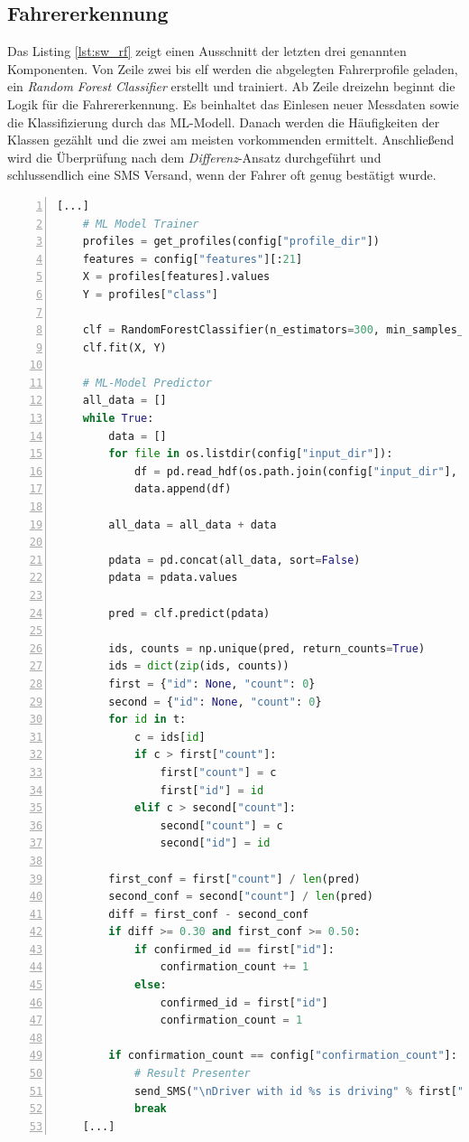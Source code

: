 \subsection{Fahrererkennung}
\label{sec:driver_identification}

Das Listing \ref{lst:sw_rf} zeigt einen Ausschnitt der letzten drei genannten Komponenten. Von Zeile zwei bis elf werden die abgelegten Fahrerprofile geladen, ein \textit{Random Forest Classifier} erstellt und trainiert. Ab Zeile dreizehn beginnt die Logik für die Fahrererkennung. Es beinhaltet das Einlesen neuer Messdaten sowie die Klassifizierung durch das ML-Modell. Danach werden die Häufigkeiten der Klassen gezählt und die zwei am meisten vorkommenden ermittelt. Anschließend wird die Überprüfung nach dem \textit{Differenz}-Ansatz durchgeführt und schlussendlich eine SMS Versand, wenn der Fahrer oft genug bestätigt wurde.

\begin{lstlisting}[frame=lines, caption=Ausschnitt Fahreridentifikation, captionpos=b, label = lst:sw_rf, numbers=left, language=Python, showstringspaces=false, basicstyle=\footnotesize]
    [...]
    # ML Model Trainer
    profiles = get_profiles(config["profile_dir"])
    features = config["features"][:21]
    X = profiles[features].values
    Y = profiles["class"]

    clf = RandomForestClassifier(n_estimators=300, min_samples_leaf=1, min_samples_split=3, criterion="gini", max_depth=None)
    clf.fit(X, Y)

    # ML-Model Predictor
    all_data = []
    while True:
        data = []
        for file in os.listdir(config["input_dir"]):
            df = pd.read_hdf(os.path.join(config["input_dir"], file))
            data.append(df)

        all_data = all_data + data

        pdata = pd.concat(all_data, sort=False)
        pdata = pdata.values

        pred = clf.predict(pdata)

        ids, counts = np.unique(pred, return_counts=True)
        ids = dict(zip(ids, counts))
        first = {"id": None, "count": 0}
        second = {"id": None, "count": 0}
        for id in t:
            c = ids[id]
            if c > first["count"]:
                first["count"] = c
                first["id"] = id
            elif c > second["count"]:
                second["count"] = c
                second["id"] = id

        first_conf = first["count"] / len(pred)
        second_conf = second["count"] / len(pred)
        diff = first_conf - second_conf
        if diff >= 0.30 and first_conf >= 0.50:
            if confirmed_id == first["id"]:
                confirmation_count += 1
            else:
                confirmed_id = first["id"]
                confirmation_count = 1

        if confirmation_count == config["confirmation_count"]:
            # Result Presenter
            send_SMS("\nDriver with id %s is driving" % first["id"], config["number"])
            break
    [...]
\end{lstlisting}

